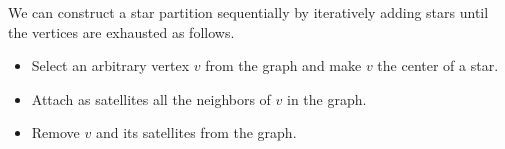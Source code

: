\begin{gram}
\label{graphcon::star::partition::seq}

We can construct a star partition sequentially by iteratively adding
stars until the vertices are exhausted as follows.

\begin{itemize}

\item Select an arbitrary vertex $v$ from the graph and make $v$ the
  center of a star.

\item Attach as satellites all the neighbors of $v$ in the graph.

\item Remove $v$ and its satellites from the graph.

\end{itemize}
%
\end{gram}

